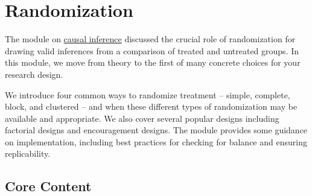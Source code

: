 \documentclass[12pt,]{book}
\begin{document}
\hypertarget{randomization}{%
\chapter{Randomization}\label{randomization}}

The module on \href{causal-inference.html}{causal inference} discussed the crucial role of randomization for drawing valid inferences from a comparison of treated and untreated groups. In this module, we move from theory to the first of many concrete choices for your research design.

We introduce four common ways to randomize treatment -- simple, complete, block, and clustered -- and when these different types of randomization may be available and appropriate. We also cover several popular designs including factorial designs and encouragement designs. The module provides some guidance on implementation, including best practices for checking for balance and ensuring replicability.

\hypertarget{core-content-2}{%
\section{Core Content}\label{core-content-2}}
\end{document}
